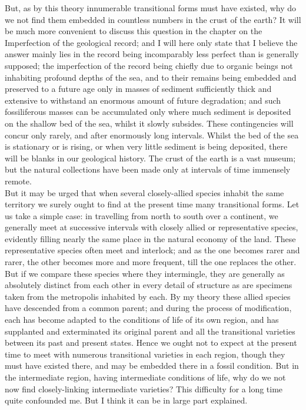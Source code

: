 \indent But, as by this theory innumerable transitional forms must have existed, why do we not find them embedded in countless numbers in the crust of the earth? It will be much more convenient to discuss this question in the chapter on the Imperfection of the geological record; and I will here only state that I believe the answer mainly lies in the record being incomparably less perfect than is generally supposed; the imperfection of the record being chiefly due to organic beings not inhabiting profound depths of the sea, and to their remains being embedded and preserved to a future age only in masses of sediment sufficiently thick and extensive to withstand an enormous amount of future degradation; and such fossiliferous masses can be accumulated only where much sediment is deposited on the shallow bed of the sea, whilst it slowly subsides. These contingencies will concur only rarely, and after enormously long intervals. Whilst the bed of the sea is stationary or is rising, or when very little sediment is being deposited, there will be blanks in our geological history. The crust of the earth is a vast museum; but the natural collections have been made only at intervals of time immensely remote.\\
\indent But it may be urged that when several closely-allied species inhabit the same territory we surely ought to find at the present time many transitional forms. Let us take a simple case: in travelling from north to south over a continent, we generally meet at successive intervals with closely allied or representative species, evidently filling nearly the same place in the natural economy of the land. These representative species often meet and interlock; and as the one becomes rarer and rarer, the other becomes more and more frequent, till the one replaces the other. But if we compare these species where they intermingle, they are generally as absolutely distinct from each other in every detail of structure as are specimens taken from the metropolis inhabited by each. By my theory these allied species have descended from a common parent; and during the process of modification, each has become adapted to the conditions of life of its own region, and has supplanted and exterminated its original parent and all the transitional varieties between its past and present states. Hence we ought not to expect at the present time to meet with numerous transitional varieties in each region, though they must have existed there, and may be embedded there in a fossil condition. But in the intermediate region, having intermediate conditions of life, why do we not now find closely-linking intermediate varieties? This difficulty for a long time quite confounded me. But I think it can be in large part explained.\\
